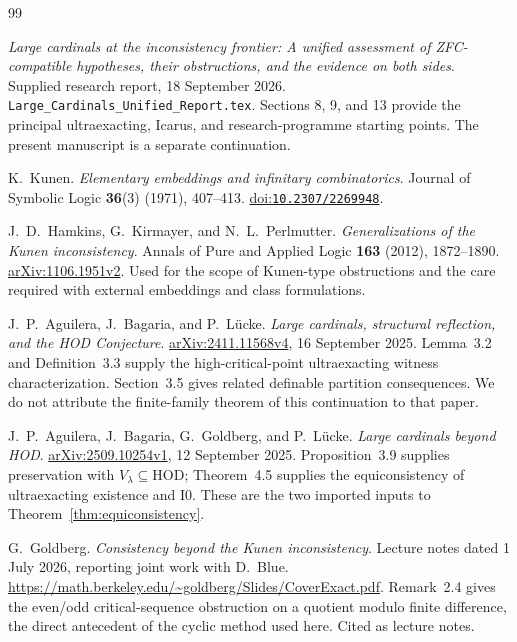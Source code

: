 \documentclass[11pt,letterpaper]{article}
\theoremstyle{definition}
\newcommand{\HOD}{\mathrm{HOD}}
\newcommand{\Izero}{\mathrm{I0}}
\newcommand{\arxiv}[1]{\href{https://arxiv.org/abs/#1}{arXiv:#1}}
\newcommand{\doi}[1]{\href{https://doi.org/#1}{doi:\nolinkurl{#1}}}
\begin{document}
\vspace{10pt}
{}
\begin{thebibliography}{99}
\small
\setlength{\itemsep}{7pt}
\setlength{\parskip}{1pt}

\emph{Large cardinals at the inconsistency frontier: A unified assessment of ZFC-compatible hypotheses, their obstructions, and the evidence on both sides}.
Supplied research report, 18 September 2026.
\nolinkurl{Large_Cardinals_Unified_Report.tex}.
Sections 8, 9, and 13 provide the principal ultraexacting, Icarus, and research-programme starting points. The present manuscript is a separate continuation.

K.~Kunen. \emph{Elementary embeddings and infinitary combinatorics}.
Journal of Symbolic Logic \textbf{36}(3) (1971), 407--413.
\doi{10.2307/2269948}.

J.~D.~Hamkins, G.~Kirmayer, and N.~L.~Perlmutter.
\emph{Generalizations of the Kunen inconsistency}.
Annals of Pure and Applied Logic \textbf{163} (2012), 1872--1890.
\arxiv{1106.1951v2}.
Used for the scope of Kunen-type obstructions and the care required with external embeddings and class formulations.

J.~P.~Aguilera, J.~Bagaria, and P.~L\"ucke.
\emph{Large cardinals, structural reflection, and the HOD Conjecture}.
\arxiv{2411.11568v4}, 16 September 2025.
Lemma~3.2 and Definition~3.3 supply the high-critical-point ultraexacting witness characterization. Section~3.5 gives related definable partition consequences. We do not attribute the finite-family theorem of this continuation to that paper.

J.~P.~Aguilera, J.~Bagaria, G.~Goldberg, and P.~L\"ucke.
\emph{Large cardinals beyond HOD}.
\arxiv{2509.10254v1}, 12 September 2025.
Proposition~3.9 supplies preservation with $V_\lambda\subseteq\HOD$; Theorem~4.5 supplies the equiconsistency of ultraexacting existence and $\Izero$. These are the two imported inputs to Theorem~\ref{thm:equiconsistency}.

G.~Goldberg. \emph{Consistency beyond the Kunen inconsistency}.
Lecture notes dated 1 July 2026, reporting joint work with D.~Blue.
\url{https://math.berkeley.edu/~goldberg/Slides/CoverExact.pdf}.
Remark~2.4 gives the even/odd critical-sequence obstruction on a quotient modulo finite difference, the direct antecedent of the cyclic method used here. Cited as lecture notes.

\end{thebibliography}
\end{document}
